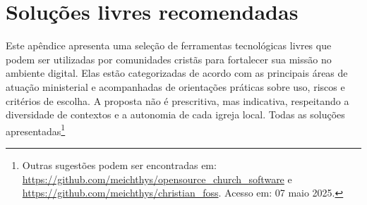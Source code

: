 \chapter{Soluções livres recomendadas} \label{apendice:solucoes}

Este apêndice apresenta uma seleção de ferramentas tecnológicas livres que podem ser utilizadas por comunidades cristãs para fortalecer sua missão no ambiente digital. Elas estão categorizadas de acordo com as principais áreas de atuação ministerial e acompanhadas de orientações práticas sobre uso, riscos e critérios de escolha. A proposta não é prescritiva, mas indicativa, respeitando a diversidade de contextos e a autonomia de cada igreja local. Todas as soluções apresentadas\footnote{Outras sugestões podem ser encontradas em: \url{https://github.com/meichthys/opensource_church_software} e \url{https://github.com/meichthys/christian_foss}. Acesso em: 07 maio 2025.}

